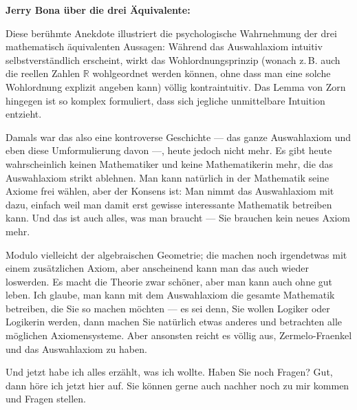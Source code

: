 \begin{didactic-insight}
\textbf{Jerry Bona über die drei Äquivalente:}
\begin{quote}
\end{quote}
Diese berühmte Anekdote illustriert die psychologische Wahrnehmung der drei mathematisch äquivalenten Aussagen: Während das Auswahlaxiom intuitiv selbstverständlich erscheint, wirkt das Wohlordnungsprinzip (wonach z.\,B. auch die reellen Zahlen $\mathbb{R}$ wohlgeordnet werden können, ohne dass man eine solche Wohlordnung explizit angeben kann) völlig kontraintuitiv. Das Lemma von Zorn hingegen ist so komplex formuliert, dass sich jegliche unmittelbare Intuition entzieht.
\end{didactic-insight}

\begin{math-stroke}
\end{math-stroke}

\begin{spoken-clean}[01:25:26 - 01:33:02]
Damals war das also eine kontroverse Geschichte --- das ganze Auswahlaxiom und eben diese Umformulierung davon ---, heute jedoch nicht mehr. Es gibt heute wahrscheinlich keinen Mathematiker und keine Mathematikerin mehr, die das Auswahlaxiom strikt ablehnen. Man kann natürlich in der Mathematik seine Axiome frei wählen, aber der Konsens ist: Man nimmt das Auswahlaxiom mit dazu, einfach weil man damit erst gewisse interessante Mathematik betreiben kann. Und das ist auch alles, was man braucht --- Sie brauchen kein neues Axiom mehr.

Modulo vielleicht der algebraischen Geometrie; die machen noch irgendetwas mit einem zusätzlichen Axiom, aber anscheinend kann man das auch wieder loswerden. Es macht die Theorie zwar schöner, aber man kann auch ohne gut leben. Ich glaube, man kann mit dem Auswahlaxiom die gesamte Mathematik betreiben, die Sie so machen möchten --- es sei denn, Sie wollen Logiker oder Logikerin werden, dann machen Sie natürlich etwas anderes und betrachten alle möglichen Axiomensysteme. Aber ansonsten reicht es völlig aus, Zermelo-Fraenkel und das Auswahlaxiom zu haben.

Und jetzt habe ich alles erzählt, was ich wollte. Haben Sie noch Fragen? Gut, dann höre ich jetzt hier auf. Sie können gerne auch nachher noch zu mir kommen und Fragen stellen.
\end{spoken-clean}

